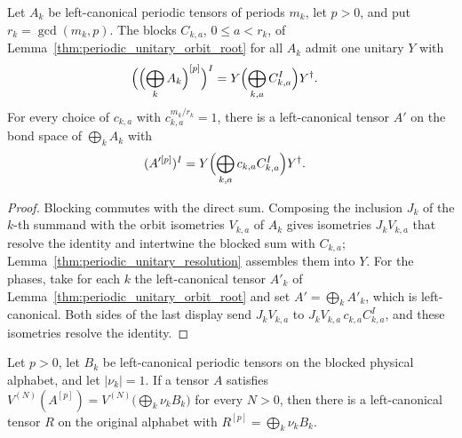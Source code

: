 \begin{lemma}
    \label{thm:periodic_block_sum_orbit_root}
    \leanok
    Let $A_k$ be left-canonical periodic tensors of periods $m_k$, let $p>0$,
    and put $r_k=\gcd(m_k,p)$. The blocks $C_{k,a}$, $0\le a<r_k$, of
    Lemma~\ref{thm:periodic_unitary_orbit_root} for all $A_k$ admit one
    unitary $Y$ with
    \begin{align}
        \Bigl(\Bigl(\bigoplus_kA_k\Bigr)^{[p]}\Bigr)^I & =Y\Bigl(\bigoplus_{k,a}C_{k,a}^I\Bigr)Y^\dagger. \notag
    \end{align}
    For every choice of $c_{k,a}$ with $c_{k,a}^{m_k/r_k}=1$, there is a
    left-canonical tensor $A'$ on the bond space of $\bigoplus_kA_k$ with
    \begin{align}
        (A'^{[p]})^I & =Y\Bigl(\bigoplus_{k,a}c_{k,a}C_{k,a}^I\Bigr)Y^\dagger. \notag
    \end{align}
\end{lemma}

\begin{proof}
    \leanok
    Blocking commutes with the direct sum. Composing the inclusion $J_k$ of
    the $k$-th summand with the orbit isometries $V_{k,a}$ of $A_k$ gives
    isometries $J_kV_{k,a}$ that resolve the identity and intertwine the
    blocked sum with $C_{k,a}$; Lemma~\ref{thm:periodic_unitary_resolution}
    assembles them into $Y$. For the phases, take for each $k$ the
    left-canonical tensor $A'_k$ of
    Lemma~\ref{thm:periodic_unitary_orbit_root} and set
    $A'=\bigoplus_kA'_k$, which is left-canonical. Both sides of the last
    display send $J_kV_{k,a}$ to $J_kV_{k,a}\,c_{k,a}C_{k,a}^I$, and these
    isometries resolve the identity.
\end{proof}

\begin{lemma}
    \label{thm:periodic_trace_preserving_root}
    \leanok
    Let $p>0$, let $B_k$ be left-canonical periodic tensors on the blocked
    physical alphabet, and let $|\nu_k|=1$. If a tensor $A$ satisfies
    $V^{(N)}(A^{[p]})=V^{(N)}\bigl(\bigoplus_k\nu_kB_k\bigr)$ for every $N>0$,
    then there is a left-canonical tensor $R$ on the original alphabet with
    $R^{[p]}=\bigoplus_k\nu_kB_k$.
\end{lemma}

